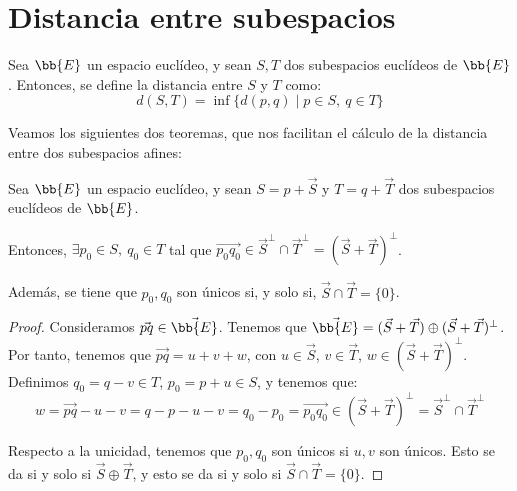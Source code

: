 \section{Distancia entre subespacios}
\begin{definicion}
    Sea $\bb{E}$ un espacio euclídeo, y sean $S,T$ dos subespacios euclídeos de $\bb{E}$. Entonces, se define la distancia entre $S$ y $T$ como:
    \begin{equation*}
        d(S,T) = \inf\{d(p,q)\mid p\in S,~q\in T\}
    \end{equation*}
\end{definicion}

Veamos los siguientes dos teoremas, que nos facilitan el cálculo de la distancia entre dos subespacios afines:
\begin{teo}
    Sea $\bb{E}$ un espacio euclídeo, y sean $S=p+\vec{S}$ y $T=q+\vec{T}$ dos subespacios euclídeos de $\bb{E}$.

    Entonces, $\exists p_0\in S,~ q_0\in T$ tal que $\vec{p_0q_0}\in \vec{S}^\perp\cap \vec{T}^\perp = (\vec{S} + \vec{T})^\perp$.


    Además, se tiene que $p_0,q_0$ son únicos si, y solo si, $\vec{S}\cap \vec{T}=\{0\}$.
\end{teo}
\begin{proof}
    Consideramos $\vec{pq}\in \vec{\bb{E}}$. Tenemos que $\vec{\bb{E}}=(\vec{S}+\vec{T}) \oplus (\vec{S}+\vec{T})^\perp$. Por tanto, tenemos que $\vec{pq}=u+v+w$, con $u\in \vec{S}$, $v\in \vec{T}$, $w\in (\vec{S}+\vec{T})^\perp$. Definimos $q_0=q-v\in T$, $p_0= p+u\in S$, y tenemos que:
    \begin{equation*}
        w = \vec{pq} - u -v = q-p-u-v=q_0-p_0=\vec{p_0q_0} \in (\vec{S} + \vec{T})^\perp = \vec{S}^\perp\cap \vec{T}^\perp
    \end{equation*}

    Respecto a la unicidad, tenemos que $p_0, q_0$ son únicos si $u,v$ son únicos. Esto se da si y solo si $\vec{S}\oplus \vec{T}$, y esto se da si y solo si $\vec{S}\cap \vec{T}=\{0\}$.
\end{proof}

